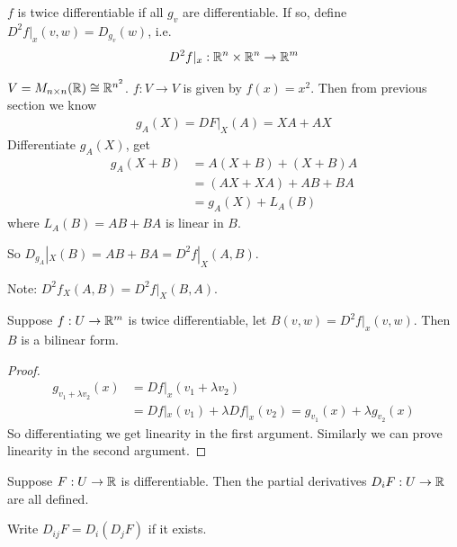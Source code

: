 \documentclass[a4paper]{article}
\begin{document}
\begin{defi}
$f$ is twice differentiable if all $g_v$ are differentiable. If so, define $D^2f|_x(v,w)=D_{g_v}(w)$, i.e.
\begin{equation*}
\begin{aligned}
D^2 f|_x: \mathbb{R}^n \times \mathbb{R}^n \to \mathbb{R}^m
\end{aligned}
\end{equation*}
\end{defi}

\begin{eg}
$V=M_{n\times n}(\mathbb{R}) \cong \mathbb{R}^{n^2}$. $f:V \to V$ is given by $f(x)=x^2$. Then from previous section we know
\begin{equation*}
\begin{aligned}
g_A(X)=DF|_X(A)=XA+AX
\end{aligned}
\end{equation*}
Differentiate $g_A(X)$, get
\begin{equation*}
\begin{aligned}
g_A(X+B)&=A(X+B)+(X+B)A\\
&=(AX+XA)+AB+BA\\
&=g_A(X)+L_A(B)
\end{aligned}
\end{equation*}
where $L_A(B)=AB+BA$ is linear in $B$.

So $D_{g_A}|_X(B)=AB+BA=D^2f|_X(A,B)$.

Note: $D^2 f_X(A,B)=D^2f|_X(B,A)$.
\end{eg}

\begin{lemma}
Suppose $f:U \to \mathbb{R}^m$ is twice differentiable, let $B(v,w)=D^2f|_x(v,w)$. Then $B$ is a bilinear form.
\begin{proof}
\begin{equation*}
\begin{aligned}
g_{v_1+\lambda v_2} (x) &= Df|_x (v_1+\lambda v_2)\\
&=Df|_x(v_1)+\lambda Df|_x(v_2) = g_{v_1}(x)+\lambda g_{v_2}(x)
\end{aligned}
\end{equation*}
So differentiating we get linearity in the first argument. Similarly we can prove linearity in the second argument.
\end{proof}
\end{lemma}

Suppose $F:U \to \mathbb{R}$ is differentiable. Then the partial derivatives $D_i F: U \to \mathbb{R}$ are all defined.

\begin{notation}
Write $D_{ij}F = D_i (D_j F)$ if it exists.
\end{notation}
\end{document}
